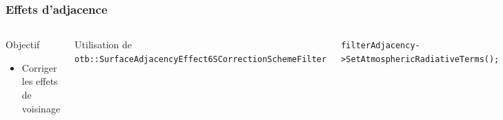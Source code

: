 \documentclass[compress]{beamer}
\begin{document}
\begin{frame}

  \frametitle{Effets d'adjacence}
     \begin{columns}

  \begin{block}{Objectif}
   \begin{itemize}
    \item Corriger les effets de voisinage
   \end{itemize}
  \end{block}

  \footnotesize
  Utilisation de \tiny \texttt{otb::SurfaceAdjacencyEffect6SCorrectionSchemeFilter}

  \footnotesize


  \tiny 
  \texttt{filterAdjacency->SetAtmosphericRadiativeTerms();}

  \texttt{filterAdjacency->SetZenithalViewingAngle();}

  \texttt{filterAdjacency->SetWindowRadius();}

  \texttt{filterAdjacency->SetPixelSpacingInKilometers();}

  \footnotesize
  \begin{equation*}
  \rho_{S} = \frac{ \rho_{S}^{unif}.T(\mu_{V}) - <\rho_{S}>.t_{d}(\mu_{v}) }{ exp(-\delta/\mu_{v}) }
  \end{equation*}
  \begin{itemize}
    \item $\rho_{S}^{unif}$ réflectance au sol sous hypothèse
      d'environnement uniforme
    \item $T(\mu_{V})$ transmittance vers le haut
    \item $t_{d}(\mu_{S})$ transmittance diffuse vers le haut
    \item $exp(-\delta/\mu_{v})$ transmittance directe vers le haut
    \item $<\rho_{S}>$ proportion de la contribution de l'environnement à
      la réflectance du pixel observé
  \end{itemize}

  \end{columns}
\end{frame}
\end{document}
